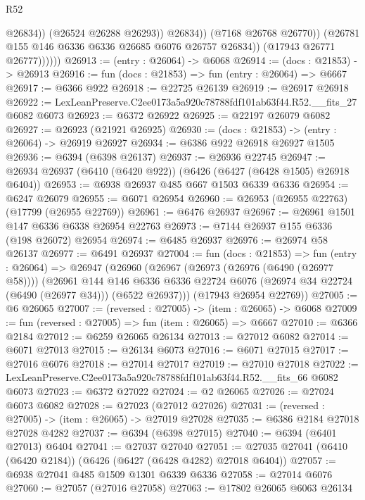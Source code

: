 \begin{lexlean}{R52}
\begin{coremodule}
                            @26834))
                        (@26524 @26288 @26293))
                      @26834))
                  (@7168 @26768 @26770))
                (@26781 @155 @146 @6336 @6336 @26685 @6076 @26757 @26834))
              (@17943 @26771 @26777))))))
@26913 := (entry : @26064) -> @6068
@26914 := (docs : @21853) -> @26913
@26916 := fun (docs : @21853) => fun (entry : @26064) => @6667
@26917 := @6366 @922
@26918 := @22725 @26139
@26919 := @26917 @26918
@26922 := LexLeanPreserve.C2ee0173a5a920c78788fdf101ab63f44.R52.__fits_27 @6082 @6073
@26923 := @6372 @26922
@26925 := @22197 @26079 @6082
@26927 := @26923 (@21921 @26925)
@26930 := (docs : @21853) -> (entry : @26064) -> @26919 @26927
@26934 := @6386 @922 @26918 @26927 @1505
@26936 := @6394 (@6398 @26137)
@26937 := @26936 @22745
@26947 := @26934 @26937 (@6410 (@6420 @922)) (@6426 (@6427 (@6428 @1505) @26918 @6404))
@26953 := @6938 @26937 @485 @667 @1503 @6339 @6336
@26954 := @6247 @26079
@26955 := @6071 @26954
@26960 := @26953 (@26955 @22763) (@17799 (@26955 @22769))
@26961 := @6476 @26937
@26967 := @26961 @1501 @147 @6336 @6338 @26954 @22763
@26973 := @7144 @26937 @155 @6336 (@198 @26072) @26954
@26974 := @6485 @26937
@26976 := @26974 @58 @26137
@26977 := @6491 @26937
@27004 := fun (docs : @21853) =>
  fun (entry : @26064) =>
  @26947
    (@26960
      (@26967
        (@26973 (@26976 (@6490 (@26977 @58))))
        (@26961
          @144
          @146
          @6336
          @6336
          @22724
          @6076
          (@26974 @34 @22724 (@6490 (@26977 @34)))
          (@6522 @26937)))
      (@17943 @26954 @22769))
@27005 := @6 @26065
@27007 := (reversed : @27005) -> (item : @26065) -> @6068
@27009 := fun (reversed : @27005) => fun (item : @26065) => @6667
@27010 := @6366 @2184
@27012 := @6259 @26065 @26134
@27013 := @27012 @6082
@27014 := @6071 @27013
@27015 := @26134 @6073
@27016 := @6071 @27015
@27017 := @27016 @6076
@27018 := @27014 @27017
@27019 := @27010 @27018
@27022 := LexLeanPreserve.C2ee0173a5a920c78788fdf101ab63f44.R52.__fits_66 @6082 @6073
@27023 := @6372 @27022
@27024 := @2 @26065
@27026 := @27024 @6073 @6082
@27028 := @27023 (@27012 @27026)
@27031 := (reversed : @27005) -> (item : @26065) -> @27019 @27028
@27035 := @6386 @2184 @27018 @27028 @4282
@27037 := @6394 (@6398 @27015)
@27040 := @6394 (@6401 @27013) @6404
@27041 := @27037 @27040
@27051 := @27035 @27041 (@6410 (@6420 @2184)) (@6426 (@6427 (@6428 @4282) @27018 @6404))
@27057 := @6938 @27041 @485 @1509 @1301 @6339 @6336
@27058 := @27014 @6076
@27060 := @27057 (@27016 @27058)
@27063 := @17802 @26065 @6063 @26134

\end{coremodule}
\end{lexlean}
